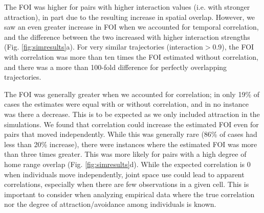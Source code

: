 \documentclass[letterpaper]{article}
\begin{document}
The FOI was higher for pairs with higher interaction values (i.e. with stronger attraction), in part due to the resulting increase in spatial overlap. %
However, we saw an even greater increase in FOI when we accounted for temporal correlation, and the difference between the two increased with higher interaction strengths (Fig. \ref{fig:simresults}a). For very similar trajectories (interaction$>$0.9), the FOI with correlation was more than ten times the FOI estimated without correlation, and there was a more than 100-fold difference for perfectly overlapping trajectories.  


The FOI was generally greater when we accounted for correlation; in only 19\% of cases the estimates were equal with or without correlation, and in no instance was there a decrease. This is to be expected as we only included attraction in the simulations. 
We found that correlation could increase the estimated FOI even for pairs that moved independently. While this was generally rare (86\% of cases had less than 20\% increase), %
there were  instances where the estimated FOI was more than three times greater. This was more likely for pairs with a high degree of home range overlap (Fig. \ref{fig:simresults}d). 
While the expected correlation is 0 when individuals move independently, joint space use could lead to apparent correlations, especially when there are few observations in a given cell. This is important to consider when analyzing empirical data where the true correlation nor the degree of attraction/avoidance among individuals is known. 
\end{document}
